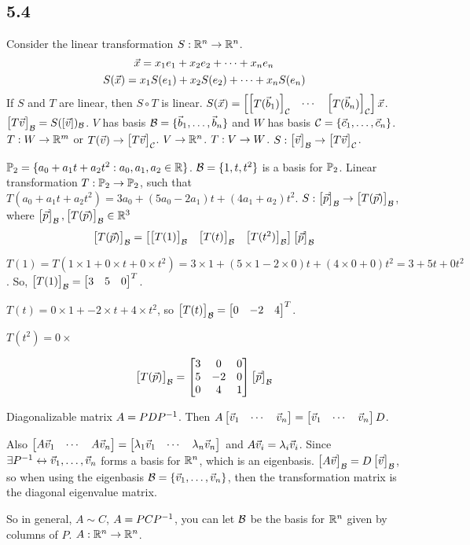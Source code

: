 \documentclass[10pt,a4paper]{article}
\begin{document}
\subsection{5.4}
Consider the linear transformation $S:\mb{R}^n \ra \mb{R}^n$.
$$\vx = x_1 e_1 + x_2 e_2 + \cdots + x_n e_n$$
$$S(\vx) = x_1 S(e_1) + x_2 S(e_2) + \cdots + x_n S(e_n)$$
If $S$ and $T$ are linear, then $S\circ T$ is linear.
$S(\vx) = \mat{\mat{T(\vb_1)}_\mc C & \cdots & \mat{T(\vb_n)}_\mc C} \vx$.
$\mat{T\vv}_\mc B = S([\vv])_\mc B$.
$V$ has basis $\mc B = \{\vb_1,\dots,\vb_n\}$ and $W$ has basis $\mc C = \{\vc_1,\dots,\vc_n\}$. $T:W \ra \mb{R}^m$ or $T(\vv) \ra \mat{T\vv}_\mc C$. $V \ra \mb{R}^n$. $T:V\ra W$. $S:\mat{\vv}_\mc B \ra \mat{T\vv}_\mc C$.
\begin{example}
	$\mb{P}_2 = \{a_0+a_1 t + a_2 t^2:a_0,a_1,a_2 \in \mb{R}\}$.
	$\mc B = \{1,t,t^2\}$ is a basis for $\mb{P}_2$.
	Linear transformation $T:\mb{P}_2 \ra \mb{P}_2$, such that $T(a_0 + a_1 t + a_2 t^2) = 3a_0 + (5a_0 - 2a_1)t + (4a_1 + a_2)t^2$.
	$S:\mat{\vp}_\mc B \ra \mat{T(\vp)}_\mc B$, where $\mat{\vp}_\mc B,\mat{T(\vp)}_\mc B \in \mb{R}^3$
	$$\mat{T(\vp)}_\mc B = \mat{\mat{T(1)}_\mc B & \mat{T(t)}_\mc B & \mat{T(t^2)}_\mc B}\mat{\vp}_\mc B$$
	
	$T(1) = T(1\times 1 + 0\times t + 0\times t^2) = 3\times 1 + (5\times 1 - 2\times 0)t + (4\times 0 + 0)t^2 = 3+5t+0t^2$. So, $\mat{T(1)}_\mc B = \mat{3 & 5 & 0}^T$.
	
	$T(t) = 0\times 1 + -2 \times t + 4 \times t^2$, so $\mat{T(t)}_\mc B = \mat{0&-2&4}^T$.
	
	$T(t^2) = 0\times $
	
	$$\mat{T(\vp)}_\mc B = \mat{3 & 0 & 0 \\ 5 & -2 & 0 \\ 0 & 4 & 1}\mat{\vp}_\mc B$$
	
	Diagonalizable matrix $A = PDP\inv$. Then $A\mat{\vv_1 & \cdots & \vv_n} = \mat{\vv_1 & \cdots & \vv_n}D$. 
	
	Also $\mat{A\vv_1 & \cdots & A\vv_n} = \mat{\lambda_1 \vv_1 & \cdots & \lambda_n \vv_n}$ and $A\vv_i = \lambda_i \vv_i$. Since $\exists P\inv \leftrightarrow \vv_1, \dots, \vv_n$ forms a basis for $\mb{R}^n$, which is an eigenbasis.
	$\mat{A\vv}_\mc B = D \mat{\vv}_\mc B$, so when using the eigenbasis $\mc B = \{\vv_1,\dots,\vv_n\}$, then the transformation matrix is the diagonal eigenvalue matrix.
	
	So in general, $A\sim C$, $A=PCP\inv$, you can let $\mc B$ be the basis for $\mb{R}^n$ given by columns of $P$. $A:\mb{R}^n \ra \mb{R}^n$.
\end{example}
\end{document}

